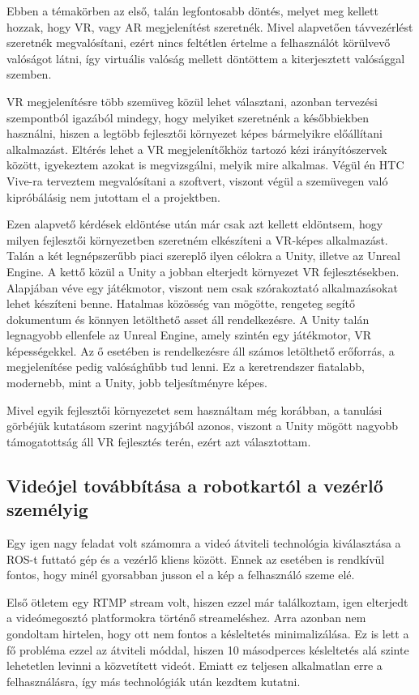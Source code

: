 \documentclass[11pt,a4paper,oneside]{article}
\begin{document}
Ebben a témakörben az első, talán legfontosabb döntés, melyet meg kellett hozzak, hogy VR, vagy AR megjelenítést szeretnék. Mivel alapvetően távvezérlést szeretnék megvalósítani, ezért nincs feltétlen értelme a felhasználót körülvevő valóságot látni, így virtuális valóság mellett döntöttem a kiterjesztett valósággal szemben.

VR megjelenítésre több szemüveg közül lehet választani, azonban tervezési szempontból igazából mindegy, hogy melyiket szeretnénk a későbbiekben használni, hiszen a legtöbb fejlesztői környezet képes bármelyikre előállítani alkalmazást. Eltérés lehet a VR megjelenítőkhöz tartozó kézi irányítószervek között, igyekeztem azokat is megvizsgálni, melyik mire alkalmas. Végül én HTC Vive-ra terveztem megvalósítani a szoftvert, viszont végül a szemüvegen való kipróbálásig nem jutottam el a projektben.

Ezen alapvető kérdések eldöntése után már csak azt kellett eldöntsem, hogy milyen fejlesztői környezetben szeretném elkészíteni a VR-képes alkalmazást. Talán a két legnépszerűbb piaci szereplő ilyen célokra a Unity, illetve az Unreal Engine. A kettő közül a Unity a jobban elterjedt környezet VR fejlesztésekben. Alapjában véve egy játékmotor, viszont nem csak szórakoztató alkalmazásokat lehet készíteni benne. Hatalmas közösség van mögötte, rengeteg segítő dokumentum és könnyen letölthető asset áll rendelkezésre. A Unity talán legnagyobb ellenfele az Unreal Engine, amely szintén egy játékmotor, VR képességekkel. Az ő esetében is rendelkezésre áll számos letölthető erőforrás, a megjelenítése pedig valósághűbb tud lenni. Ez a keretrendszer fiatalabb, modernebb, mint a Unity, jobb teljesítményre képes.

Mivel egyik fejlesztői környezetet sem használtam még korábban, a tanulási görbéjük kutatásom szerint nagyjából azonos, viszont a Unity mögött nagyobb támogatottság áll VR fejlesztés terén, ezért azt választottam.

\subsection{Videójel továbbítása a robotkartól a vezérlő személyig}

Egy igen nagy feladat volt számomra a videó átviteli technológia kiválasztása a ROS-t futtató gép és a vezérlő kliens között. Ennek az esetében is rendkívül fontos, hogy minél gyorsabban jusson el a kép a felhasználó szeme elé.

Első ötletem egy RTMP stream volt, hiszen ezzel már találkoztam, igen elterjedt a videómegosztó platformokra történő streameléshez. Arra azonban nem gondoltam hirtelen, hogy ott nem fontos a késleltetés minimalizálása. Ez is lett a fő probléma ezzel az átviteli móddal, hiszen 10 másodperces késleltetés alá szinte lehetetlen levinni a közvetített videót. Emiatt ez teljesen alkalmatlan erre a felhasználásra, így más technológiák után kezdtem kutatni.
\end{document}
